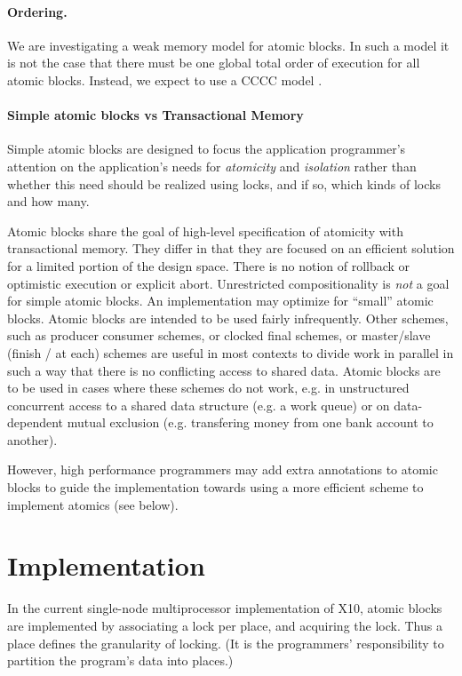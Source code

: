 \documentclass[twocolumn]{article}
\def\Xten{{\sf X10}}
\begin{document}
\paragraph{Ordering.} 
We are investigating a weak memory model for atomic blocks. In such a
model it is not the case that there must be one global total order of
execution for all atomic blocks. Instead, we expect to use a CCCC
model \cite{cccc-mm}.

\paragraph{Simple atomic blocks vs Transactional Memory}
Simple atomic blocks are designed to focus the application programmer's
attention on the application's needs for {\em atomicity} and {\em
isolation} rather than whether this need should be realized using
locks, and if so, which kinds of locks and how many. 

Atomic blocks share the goal of high-level specification of atomicity
with transactional memory. They differ in that they are focused on an
efficient solution for a limited portion of the design space. There is
no notion of rollback or optimistic execution or explicit abort.
Unrestricted compositionality is {\em not} a goal for simple atomic
blocks.  An implementation may optimize for ``small'' atomic blocks.
Atomic blocks are intended to be used fairly infrequently. Other
schemes, such as producer consumer schemes, or clocked final schemes,
or master/slave (finish / at each) schemes are useful in most contexts
to divide work in parallel in such a way that there is no conflicting
access to shared data. Atomic blocks are to be used in cases where
these schemes do not work, e.g. in unstructured concurrent access to a
shared data structure (e.g. a work queue) or on data-dependent mutual
exclusion (e.g.{} transfering money from one bank account to another).

However, high performance programmers may add extra annotations to
atomic blocks to guide the implementation towards using a more
efficient scheme to implement atomics (see below).

\section{Implementation}
In the current single-node multiprocessor implementation of \Xten{},
atomic blocks are implemented by associating a lock per place, and
acquiring the lock. Thus a place defines the granularity of locking.
(It is the programmers' responsibility to partition the program's data
into places.)
\end{document}

